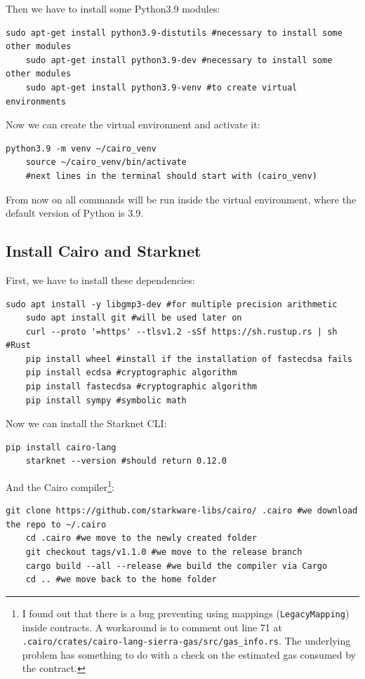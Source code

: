 \documentclass[12pt]{article}
\begin{document}
Then we have to install some Python3.9 modules:
\begin{lstlisting}[language=terminal]
    sudo apt-get install python3.9-distutils #necessary to install some other modules
    sudo apt-get install python3.9-dev #necessary to install some other modules
    sudo apt-get install python3.9-venv #to create virtual environments
\end{lstlisting}

Now we can create the virtual environment and activate it:
\begin{lstlisting}[language=terminal]
    python3.9 -m venv ~/cairo_venv
    source ~/cairo_venv/bin/activate
    #next lines in the terminal should start with (cairo_venv)
\end{lstlisting}

From now on all commands will be run inside the virtual environment, where the default version of Python is 3.9.

\subsection{Install Cairo and Starknet}
First, we have to install these dependencies:
\begin{lstlisting}[language=terminal]
    sudo apt install -y libgmp3-dev #for multiple precision arithmetic
    sudo apt install git #will be used later on
    curl --proto '=https' --tlsv1.2 -sSf https://sh.rustup.rs | sh #Rust
    pip install wheel #install if the installation of fastecdsa fails
    pip install ecdsa #cryptographic algorithm
    pip install fastecdsa #cryptographic algorithm
    pip install sympy #symbolic math
\end{lstlisting}

Now we can install the Starknet CLI:
\begin{lstlisting}[language=terminal]
    pip install cairo-lang
    starknet --version #should return 0.12.0
\end{lstlisting}

And the Cairo compiler\footnote{I found out that there is a bug preventing using mappings (\verb|LegacyMapping|) inside contracts. A workaround is to comment out line 71 at \verb|.cairo/crates/cairo-lang-sierra-gas/src/gas_info.rs|. The underlying problem has something to do with a check on the estimated gas consumed by the contract.}:
\begin{lstlisting}[language=terminal]
    git clone https://github.com/starkware-libs/cairo/ .cairo #we download the repo to ~/.cairo
    cd .cairo #we move to the newly created folder
    git checkout tags/v1.1.0 #we move to the release branch
    cargo build --all --release #we build the compiler via Cargo
    cd .. #we move back to the home folder
\end{lstlisting}
\end{document}
